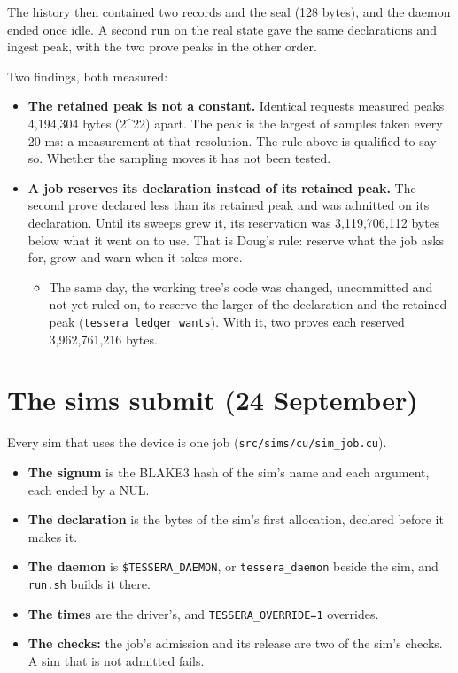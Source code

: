 The history then contained two records and the seal (128 bytes), and the daemon ended once idle. A second run on the real state gave the same declarations and ingest peak, with the two prove peaks in the other order.

Two findings, both measured:

\begin{itemize}
\item \textbf{The retained peak is not a constant.} Identical requests measured peaks 4,194,304 bytes (2\textasciicircum{}22) apart. The peak is the largest of samples taken every 20 ms: a measurement at that resolution. The rule above is qualified to say so. Whether the sampling moves it has not been tested.
\item \textbf{A job reserves its declaration instead of its retained peak.} The second prove declared less than its retained peak and was admitted on its declaration. Until its sweeps grew it, its reservation was 3,119,706,112 bytes below what it went on to use. That is Doug's rule: reserve what the job asks for, grow and warn when it takes more.

\begin{itemize}
\item The same day, the working tree's code was changed, uncommitted and not yet ruled on, to reserve the larger of the declaration and the retained peak (\texttt{tessera\_\allowbreak{}ledger\_\allowbreak{}wants}). With it, two proves each reserved 3,962,761,216 bytes.
\end{itemize}
\end{itemize}

\section{\texorpdfstring{The sims submit (24 September)}{The sims submit (24 September)}}

Every sim that uses the device is one job (\texttt{src/\allowbreak{}sims/\allowbreak{}cu/\allowbreak{}sim\_\allowbreak{}job.\allowbreak{}cu}).

\begin{itemize}
\item \textbf{The signum} is the BLAKE3 hash of the sim's name and each argument, each ended by a NUL.
\item \textbf{The declaration} is the bytes of the sim's first allocation, declared before it makes it.
\item \textbf{The daemon} is \texttt{\$TESSERA\_\allowbreak{}DAEMON}, or \texttt{tessera\_\allowbreak{}daemon} beside the sim, and \texttt{run.\allowbreak{}sh} builds it there.
\item \textbf{The times} are the driver's, and \texttt{TESSERA\_\allowbreak{}OVERRIDE=1} overrides.
\item \textbf{The checks:} the job's admission and its release are two of the sim's checks. A sim that is not admitted fails.
\end{itemize}

